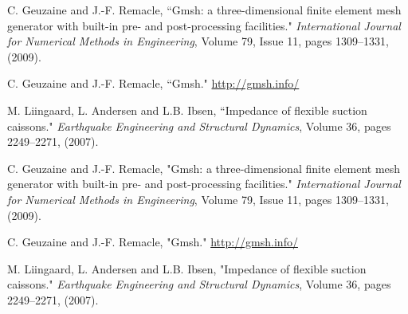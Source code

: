 \documentclass[a4]{article}
\begin{document}
\FloatBarrier

\begin{thebibliography}{99}
	

	 C. Geuzaine and J.-F. Remacle, ``Gmsh: a three-dimensional finite element mesh generator with built-in pre- and post-processing facilities." \textit{International Journal for Numerical Methods in Engineering}, Volume 79, Issue 11, pages 1309--1331, (2009).
	
	 C. Geuzaine and J.-F. Remacle, ``Gmsh." \url{http://gmsh.info/}
	
	 M. Liingaard, L. Andersen and L.B. Ibsen, ``Impedance of flexible suction caissons." \textit{Earthquake Engineering and Structural Dynamics}, Volume 36, pages 2249--2271, (2007).

	 C. Geuzaine and J.-F. Remacle, "Gmsh: a three-dimensional finite element mesh generator with built-in pre- and post-processing facilities." \textit{International Journal for Numerical Methods in Engineering}, Volume 79, Issue 11, pages 1309--1331, (2009).
	
	 C. Geuzaine and J.-F. Remacle, "Gmsh." \url{http://gmsh.info/}
	
	 M. Liingaard, L. Andersen and L.B. Ibsen, "Impedance of flexible suction caissons." \textit{Earthquake Engineering and Structural Dynamics}, Volume 36, pages 2249--2271, (2007).

\end{thebibliography}
\end{document}
